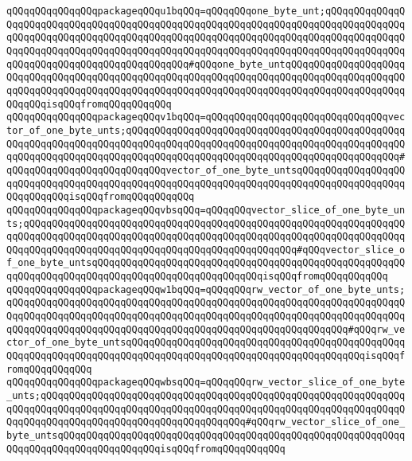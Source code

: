 \verb|qQQqqQQqqQQqqQQqpackageqQQqu1bqQQq=qQQqqQQqone_byte_unt;qQQqqQQqqQQqqQQqqQQqqQQqqQQqqQQqqQQqqQQqqQQqqQQqqQQqqQQqqQQqqQQqqQQqqQQqqQQqqQQqqQQqqQQqqQQqqQQqqQQqqQQqqQQqqQQqqQQqqQQqqQQqqQQqqQQqqQQqqQQqqQQqqQQqqQQqqQQqqQQqqQQqqQQqqQQqqQQqqQQqqQQqqQQqqQQqqQQqqQQqqQQqqQQqqQQqqQQqqQQqqQQqqQQqqQQqqQQqqQQqqQQqqQQqqQQqqQQq#qQQqone_byte_untqQQqqQQqqQQqqQQqqQQqqQQqqQQqqQQqqQQqqQQqqQQqqQQqqQQqqQQqqQQqqQQqqQQqqQQqqQQqqQQqqQQqqQQqqQQqqQQqqQQqqQQqqQQqqQQqqQQqqQQqqQQqqQQqqQQqqQQqqQQqqQQqqQQqqQQqqQQqqQQqqQQqqQQqisqQQqfromqQQqqQQqqQQq|\newline
\verb|qQQqqQQqqQQqqQQqpackageqQQqv1bqQQq=qQQqqQQqqQQqqQQqqQQqqQQqqQQqqQQqvector_of_one_byte_unts;qQQqqQQqqQQqqQQqqQQqqQQqqQQqqQQqqQQqqQQqqQQqqQQqqQQqqQQqqQQqqQQqqQQqqQQqqQQqqQQqqQQqqQQqqQQqqQQqqQQqqQQqqQQqqQQqqQQqqQQqqQQqqQQqqQQqqQQqqQQqqQQqqQQqqQQqqQQqqQQqqQQqqQQqqQQqqQQqqQQqqQQqqQQq#qQQqqQQqqQQqqQQqqQQqqQQqqQQqvector_of_one_byte_untsqQQqqQQqqQQqqQQqqQQqqQQqqQQqqQQqqQQqqQQqqQQqqQQqqQQqqQQqqQQqqQQqqQQqqQQqqQQqqQQqqQQqqQQqqQQqqQQqqQQqisqQQqfromqQQqqQQqqQQq|\newline
\verb|qQQqqQQqqQQqqQQqpackageqQQqvbsqQQq=qQQqqQQqvector_slice_of_one_byte_unts;qQQqqQQqqQQqqQQqqQQqqQQqqQQqqQQqqQQqqQQqqQQqqQQqqQQqqQQqqQQqqQQqqQQqqQQqqQQqqQQqqQQqqQQqqQQqqQQqqQQqqQQqqQQqqQQqqQQqqQQqqQQqqQQqqQQqqQQqqQQqqQQqqQQqqQQqqQQqqQQqqQQqqQQqqQQqqQQqqQQqqQQqqQQq#qQQqvector_slice_of_one_byte_untsqQQqqQQqqQQqqQQqqQQqqQQqqQQqqQQqqQQqqQQqqQQqqQQqqQQqqQQqqQQqqQQqqQQqqQQqqQQqqQQqqQQqqQQqqQQqqQQqqQQqisqQQqfromqQQqqQQqqQQq|\newline
\verb|qQQqqQQqqQQqqQQqpackageqQQqw1bqQQq=qQQqqQQqrw_vector_of_one_byte_unts;qQQqqQQqqQQqqQQqqQQqqQQqqQQqqQQqqQQqqQQqqQQqqQQqqQQqqQQqqQQqqQQqqQQqqQQqqQQqqQQqqQQqqQQqqQQqqQQqqQQqqQQqqQQqqQQqqQQqqQQqqQQqqQQqqQQqqQQqqQQqqQQqqQQqqQQqqQQqqQQqqQQqqQQqqQQqqQQqqQQqqQQqqQQqqQQqqQQqqQQq#qQQqrw_vector_of_one_byte_untsqQQqqQQqqQQqqQQqqQQqqQQqqQQqqQQqqQQqqQQqqQQqqQQqqQQqqQQqqQQqqQQqqQQqqQQqqQQqqQQqqQQqqQQqqQQqqQQqqQQqqQQqqQQqqQQqisqQQqfromqQQqqQQqqQQq|\newline
\verb|qQQqqQQqqQQqqQQqpackageqQQqwbsqQQq=qQQqqQQqrw_vector_slice_of_one_byte_unts;qQQqqQQqqQQqqQQqqQQqqQQqqQQqqQQqqQQqqQQqqQQqqQQqqQQqqQQqqQQqqQQqqQQqqQQqqQQqqQQqqQQqqQQqqQQqqQQqqQQqqQQqqQQqqQQqqQQqqQQqqQQqqQQqqQQqqQQqqQQqqQQqqQQqqQQqqQQqqQQqqQQqqQQqqQQqqQQq#qQQqrw_vector_slice_of_one_byte_untsqQQqqQQqqQQqqQQqqQQqqQQqqQQqqQQqqQQqqQQqqQQqqQQqqQQqqQQqqQQqqQQqqQQqqQQqqQQqqQQqqQQqqQQqisqQQqfromqQQqqQQqqQQq|\newline
